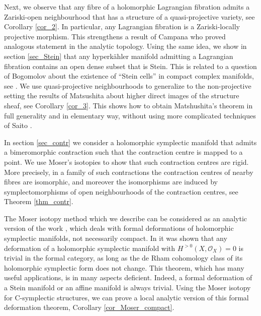 \documentclass[10pt]{amsart}
\newcommand{\calo}{\mathcal{O}}
\begin{document}
Next, we observe that any fibre of a holomorphic Lagrangian fibration
admits a Zariski-open neighbourhood that has a structure of a quasi-projective
variety, see Corollary \ref{cor_2}. In particular, any Lagrangian fibration is a Zariski-locally
projective morphism. This strengthens a result of Campana \cite{Ca} who
proved analogous statement in the analytic topology. Using the same idea,
we show in section \ref{sec_Stein} that any hyperk\"ahler manifold admitting
a Lagrangian fibration contains an open dense subset that is Stein. This
is related to a question of Bogomolov about the existence of ``Stein cells''
in compact complex manifolds, see \cite{B2}.
We use quasi-projective neighbourhoods to generalize to the non-projective setting the results
of Matsushita \cite{Ma3} about higher direct images of the structure sheaf,
see Corollary \ref{cor_3}. This shows how to obtain Matshushita's theorem in full
generality and in elementary way, without using more complicated techniques of Saito \cite{Sa}.

In section \ref{sec_contr} we consider a holomorphic symplectic manifold that
admits a bimeromorphic contraction such that the contraction centre is
mapped to a point. We use Moser's isotopies to show that such contraction
centres are rigid. More precisely, in a family of such contractions
the contraction centres of nearby fibres are isomorphic, and moreover the isomorphisms
are induced by symplectomorphisms of open neighbourhoods of the contraction centres,
see Theorem \ref{thm_contr}.

The Moser isotopy method which we describe
can be considered as an analytic version of the
work \cite{_KV:period_}, which deals with
formal deformations of holomorphic
symplectic manifolds, not necessarily compact. 
In  \cite{_KV:period_} it was shown that any 
deformation of a holomorphic symplectic
manifold with $H^{>0}(X, \calo_X)=0$
is trivial in the formal category, as
long as the de Rham cohomology class of its 
holomorphic symplectic form does not change.
This theorem, which has many useful applications, 
is in many aspects deficient. Indeed, a formal 
deformation of a Stein manifold or an affine manifold
is always trivial.
Using the Moser isotopy for
C-symplectic structures, we can
prove a local analytic version of this formal deformation
theorem, Corollary \ref{cor_Moser_compact}.
\end{document}
